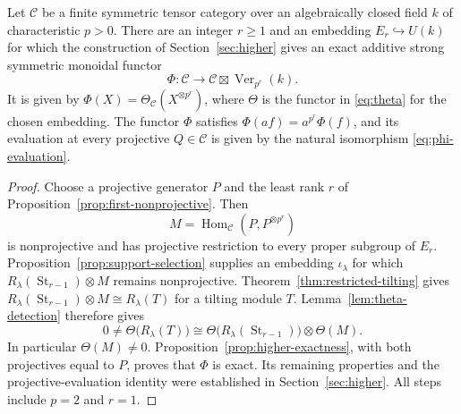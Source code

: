 \begin{theorem}
\label{thm:exact-higher-frobenius}
Let $\mathcal C$ be a finite symmetric tensor category over an
algebraically closed field $k$ of characteristic $p>0$.
There are an integer $r\ge1$ and an embedding
$E_r\hookrightarrow U(k)$ for which the construction of
Section~\ref{sec:higher} gives an exact additive strong symmetric
monoidal functor
\[
 \Phi:\mathcal C\longrightarrow
 \mathcal C\boxtimes\operatorname{Ver}_{p^r}(k).
\]
It is given by $\Phi(X)=\Theta_{\mathcal C}(X^{\otimes p^r})$, where
$\Theta$ is the functor in \eqref{eq:theta} for the chosen embedding.
The functor $\Phi$ satisfies
$\Phi(af)=a^{p^r}\Phi(f)$, and its evaluation at every projective
$Q\in\mathcal C$ is given by the natural isomorphism
\eqref{eq:phi-evaluation}.
\end{theorem}

\begin{proof}
Choose a projective generator $P$ and the least rank $r$ of
Proposition~\ref{prop:first-nonprojective}. Then
\[
 M=\operatorname{Hom}_{\mathcal C}(P,P^{\otimes p^r})
\]
is nonprojective and has projective restriction to every proper subgroup
of $E_r$. Proposition~\ref{prop:support-selection} supplies an embedding
$\iota_\lambda$ for which
$R_\lambda(\operatorname{St}_{r-1})\otimes M$ remains nonprojective.
Theorem~\ref{thm:restricted-tilting} gives
$R_\lambda(\operatorname{St}_{r-1})\otimes M\cong R_\lambda(T)$
for a tilting module $T$. Lemma~\ref{lem:theta-detection} therefore gives
\[
 0\ne\Theta\big(R_\lambda(T)\big)
 \cong\Theta\big(R_\lambda(\operatorname{St}_{r-1})\big)
       \otimes\Theta(M).
\]
In particular $\Theta(M)\ne0$. Proposition~\ref{prop:higher-exactness},
with both projectives equal to $P$, proves that $\Phi$ is exact.
Its remaining properties and the projective-evaluation identity were
established in Section~\ref{sec:higher}. All steps include $p=2$ and $r=1$.
\end{proof}

